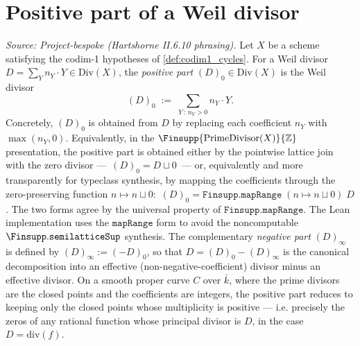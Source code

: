 \section{Positive part of a Weil divisor}
\begin{definition}


  \label{def:WeilDivisor_positivePart}
  \textit{Source: Project-bespoke (Hartshorne II.6.10 phrasing).}
  Let \(X\) be a scheme satisfying the codim-1 hypotheses of
  \ref{def:codim1_cycles}. For a Weil divisor
  \(D = \sum_Y n_Y \cdot Y \in \mathrm{Div}(X)\), the \emph{positive part}
  \((D)_0 \in \mathrm{Div}(X)\) is the Weil divisor
  \[
    (D)_0 \;:=\; \sum_{Y \,:\, n_Y > 0} n_Y \cdot Y.
  \]
  Concretely, \((D)_0\) is obtained from \(D\) by replacing each coefficient
  \(n_Y\) with \(\max(n_Y, 0)\). Equivalently, in the \(\Finsupp{\mathrm{PrimeDivisor}(X)}{\mathbb Z}\)
  presentation, the positive part is obtained either by the pointwise lattice
  join with the zero divisor — \(\,(D)_0 = D \sqcup 0\,\) — or, equivalently
  and more transparently for typeclass synthesis, by mapping the coefficients
  through the zero-preserving function \(n \mapsto n \sqcup 0\):
  \(\,(D)_0 = \mathtt{Finsupp.mapRange}\;(n \mapsto n \sqcup 0)\;D\). The two
  forms agree by the universal property of \(\mathtt{Finsupp.mapRange}\). The
  Lean implementation uses the \(\mathtt{mapRange}\) form to avoid the
  noncomputable \(\Finsupp.\mathtt{semilatticeSup}\) synthesis. The complementary \emph{negative part}
  \((D)_\infty\) is defined by \((D)_\infty := (-D)_0\), so that
  \(D = (D)_0 - (D)_\infty\) is the canonical decomposition into an
  effective (non-negative-coefficient) divisor minus an effective divisor.
  On a smooth proper curve \(C\) over \(\bar k\), where the prime divisors
  are the closed points and the coefficients are integers, the positive part
  reduces to keeping only the closed points whose multiplicity is positive
  — i.e. precisely the zeros of any rational function whose principal
  divisor is \(D\), in the case \(D = \mathrm{div}(f)\).
\end{definition}
